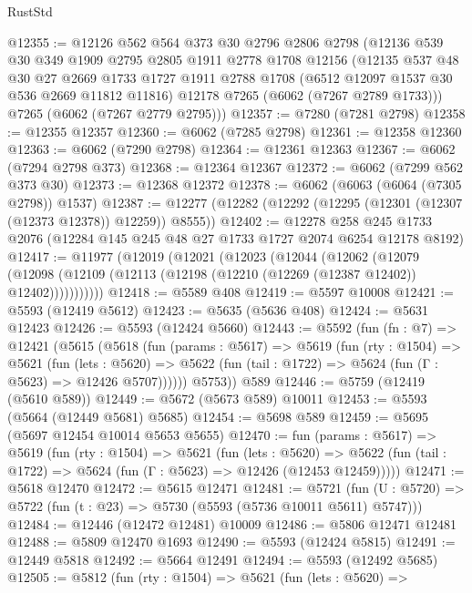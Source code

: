 \begin{lexlean}{RustStd}
\begin{coremodule}
@12355 := @12126
    @562
    @564
    @373
    @30
    @2796
    @2806
    @2798
    (@12136
      @539
      @30
      @349
      @1909
      @2795
      @2805
      @1911
      @2778
      @1708
      @12156
      (@12135
        @537
        @48
        @30
        @27
        @2669
        @1733
        @1727
        @1911
        @2788
        @1708
        (@6512 @12097 @1537 @30 @536 @2669 @11812 @11816)
        @12178
        @7265
        (@6062 (@7267 @2789 @1733)))
      @7265
      (@6062 (@7267 @2779 @2795)))
@12357 := @7280 (@7281 @2798)
@12358 := @12355 @12357
@12360 := @6062 (@7285 @2798)
@12361 := @12358 @12360
@12363 := @6062 (@7290 @2798)
@12364 := @12361 @12363
@12367 := @6062 (@7294 @2798 @373)
@12368 := @12364 @12367
@12372 := @6062 (@7299 @562 @373 @30)
@12373 := @12368 @12372
@12378 := @6062 (@6063 (@6064 (@7305 @2798)) @1537)
@12387 := @12277 (@12282 (@12292 (@12295 (@12301 (@12307 (@12373 @12378)) @12259)) @8555))
@12402 := @12278
    @258
    @245
    @1733
    @2076
    (@12284 @145 @245 @48 @27 @1733 @1727 @2074 @6254 @12178 @8192)
@12417 := @11977
    (@12019
      (@12021
        (@12023
          (@12044
            (@12062
              (@12079
                (@12098 (@12109 (@12113 (@12198 (@12210 (@12269 (@12387 @12402)) @12402)))))))))))
@12418 := @5589 @408
@12419 := @5597 @10008
@12421 := @5593 (@12419 @5612)
@12423 := @5635 (@5636 @408)
@12424 := @5631 @12423
@12426 := @5593 (@12424 @5660)
@12443 := @5592
    (fun (fn : @7) =>
    @12421
      (@5615
        (@5618
          (fun (params : @5617) =>
          @5619
            (fun (rty : @1504) =>
            @5621
              (fun (lets : @5620) =>
              @5622 (fun (tail : @1722) => @5624 (fun (Γ : @5623) => @12426 @5707))))))
        @5753))
    @589
@12446 := @5759 (@12419 (@5610 @589))
@12449 := @5672 (@5673 @589) @10011
@12453 := @5593 (@5664 (@12449 @5681) @5685)
@12454 := @5698 @589
@12459 := @5695 (@5697 @12454 @10014 @5653 @5655)
@12470 := fun (params : @5617) =>
  @5619
    (fun (rty : @1504) =>
    @5621
      (fun (lets : @5620) =>
      @5622 (fun (tail : @1722) => @5624 (fun (Γ : @5623) => @12426 (@12453 @12459)))))
@12471 := @5618 @12470
@12472 := @5615 @12471
@12481 := @5721
    (fun (U : @5720) => @5722 (fun (t : @23) => @5730 (@5593 (@5736 @10011 @5611) @5747)))
@12484 := @12446 (@12472 @12481) @10009
@12486 := @5806 @12471 @12481
@12488 := @5809 @12470 @1693
@12490 := @5593 (@12424 @5815)
@12491 := @12449 @5818
@12492 := @5664 @12491
@12494 := @5593 (@12492 @5685)
@12505 := @5812
    (fun (rty : @1504) =>
    @5621
      (fun (lets : @5620) =>

\end{coremodule}
\end{lexlean}
